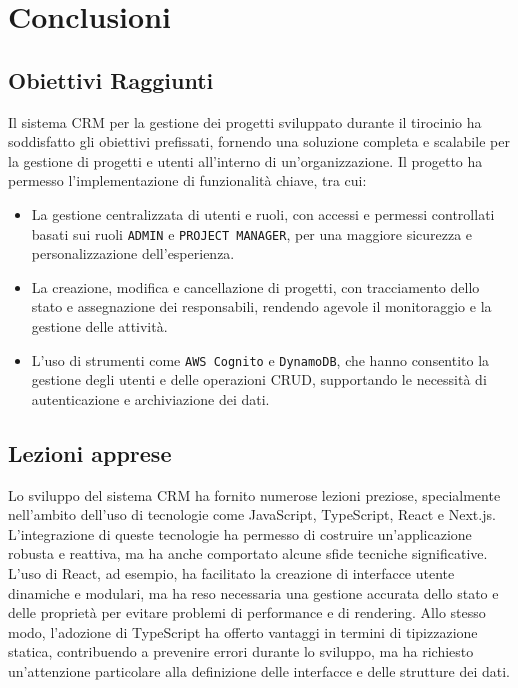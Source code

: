 \documentclass[target=bach,aauheader=,style=]{thud}
\begin{document}
\chapter{Conclusioni}

\section{Obiettivi Raggiunti}
Il sistema CRM per la gestione dei progetti sviluppato durante il tirocinio ha soddisfatto gli obiettivi prefissati, fornendo una soluzione completa e scalabile per la gestione di progetti e utenti all'interno di un'organizzazione. Il progetto ha permesso l'implementazione di funzionalità chiave, tra cui:
\begin{itemize}
    \item La gestione centralizzata di utenti e ruoli, con accessi e permessi controllati basati sui ruoli \texttt{ADMIN} e \texttt{PROJECT MANAGER}, per una maggiore sicurezza e personalizzazione dell'esperienza.
    \item La creazione, modifica e cancellazione di progetti, con tracciamento dello stato e assegnazione dei responsabili, rendendo agevole il monitoraggio e la gestione delle attività.
    \item L'uso di strumenti come \texttt{AWS Cognito} e \texttt{DynamoDB}, che hanno consentito la gestione degli utenti e delle operazioni CRUD, supportando le necessità di autenticazione e archiviazione dei dati.
\end{itemize}

\section{Lezioni apprese}
Lo sviluppo del sistema CRM ha fornito numerose lezioni preziose, specialmente nell'ambito dell'uso di tecnologie come JavaScript, TypeScript, React e Next.js. L'integrazione di queste tecnologie ha permesso di costruire un'applicazione robusta e reattiva, ma ha anche comportato alcune sfide tecniche significative. L'uso di React, ad esempio, ha facilitato la creazione di interfacce utente dinamiche e modulari, ma ha reso necessaria una gestione accurata dello stato e delle proprietà per evitare problemi di performance e di rendering. Allo stesso modo, l'adozione di TypeScript ha offerto vantaggi in termini di tipizzazione statica, contribuendo a prevenire errori durante lo sviluppo, ma ha richiesto un'attenzione particolare alla definizione delle interfacce e delle strutture dei dati.
\end{document}
